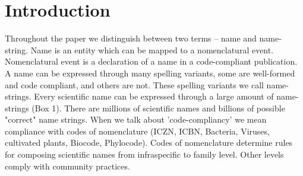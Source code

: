 \documentclass{bmcart}
\begin{document}
\begin{frontmatter}
\begin{abstractbox}

\begin{keyword}
\end{keyword}


\end{abstractbox}
%

\end{frontmatter}



\section*{Introduction}

Throughout the paper we distinguish between two terms -- name and name-string.
Name is an entity which can be mapped to a nomenclatural event. Nomenclatural
event is a declaration of a name in a code-compliant publication. A name can be
expressed through many spelling variants, some are well-formed and code
compliant, and others are not. These spelling variants we call name-strings.
Every scientific name can be expressed through a large amount of name-strings
(Box 1).  There are millions of scientific names and billions of possible
"correct" name strings. When we talk about 'code-compliancy' we mean compliance
with codes of nomenclature (ICZN, ICBN, Bacteria, Viruses, cultivated plants,
Biocode, Phylocode). Codes of nomenclature determine rules for composing
scientific names from infraspecific to family level. Other levels comply with
community practices.
\end{document}
